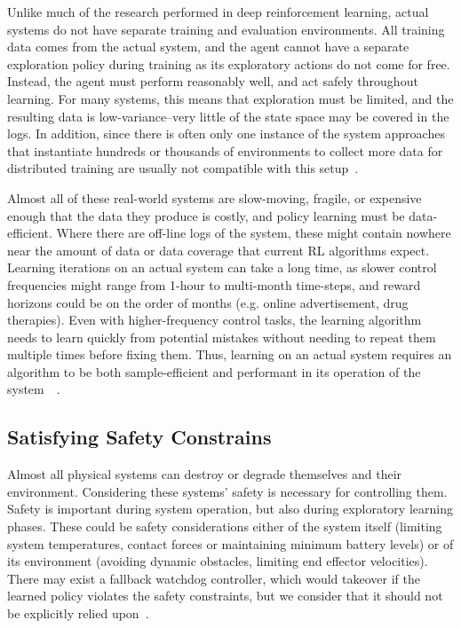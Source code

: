 \documentclass[letterpaper, 10 pt]{IEEEconf}
\begin{document}
Unlike much of the research performed in deep reinforcement learning,
actual systems do not have separate training and evaluation
environments. All training data comes from the actual system, and the
agent cannot have a separate exploration policy during training as its
exploratory actions do not come for free. Instead, the agent must
perform reasonably well, and act safely throughout learning. For many
systems, this means that exploration must be limited, and the
resulting data is low-variance–very little of the state space may be
covered in the logs. In addition, since there is often only one
instance of the system approaches that instantiate hundreds or
thousands of environments to collect more data for distributed
training are usually not compatible with this setup~\cite{deepmind2019}.

Almost all of these real-world systems are slow-moving, fragile, or
expensive enough that the data they produce is costly, and policy
learning must be data-efficient. Where there are off-line logs of the
system, these might contain nowhere near the amount of data or data
coverage that current RL algorithms expect. Learning iterations on an
actual system can take a long time, as slower control frequencies
might range from 1-hour to multi-month time-steps, and reward horizons
could be on the order of months (e.g. online advertisement, drug
therapies). Even with higher-frequency control tasks, the learning
algorithm needs to learn quickly from potential mistakes without
needing to repeat them multiple times before fixing them. Thus,
learning on an actual system requires an algorithm to be both
sample-efficient and performant in its operation of the system~\cite{deepmind2019}~\cite{microsoft_research_2018}.

\subsection{Satisfying Safety Constrains}

Almost all physical systems can destroy or degrade themselves and
their environment. Considering these systems’ safety is necessary for
controlling them. Safety is important during system operation, but
also during exploratory learning phases. These could be safety
considerations either of the system itself (limiting system
temperatures, contact forces or maintaining minimum battery levels) or
of its environment (avoiding dynamic obstacles, limiting end effector
velocities). There may exist a fallback watchdog controller, which
would takeover if the learned policy violates the safety constraints,
but we consider that it should not be explicitly relied
upon~\cite{deepmind2019}.
\end{document}

